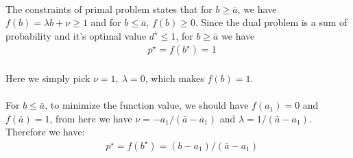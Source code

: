\paragraph{}
The constraints of primal problem states that for $b \geq \bar{a}$, we have $f(b) =\lambda b +\nu \geq 1$ and for $b \leq \bar{a}$, $f(b) \geq 0$. Since the dual problem is a sum of probability and it's optimal value $d^\star \leq 1$, for $b \geq \bar{a}$ we have 
\begin{align*}
& p^\star = f(b^\star) = 1
\end{align*}
\paragraph{}
Here we simply pick $\nu = 1, \ \lambda = 0$, which makes $f(b) = 1$.
\paragraph{}
For  $b \leq \bar{a}$, to minimize the function value, we should have $f(a_1) =0$ and $f(\bar{a}) = 1$, from here we have $\nu = -a_1/(\bar{a}-a_1)$ and $\lambda = 1/(\bar{a}-a_1)$. Therefore we have:
\begin{align*}
& p^\star = f(b^\star) = (b - a_1)/(\bar{a}-a_1)
\end{align*}